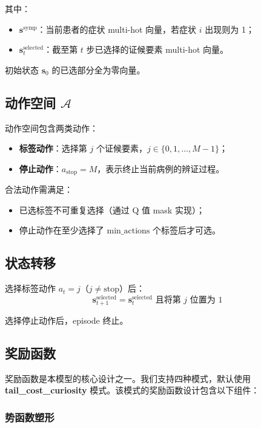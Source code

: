 \documentclass[12pt,a4paper]{article}
\newcommand{\Aset}{\mathcal{A}}
\begin{document}
其中：
\begin{itemize}
    \item $\mathbf{s}^{\text{symp}}$：当前患者的症状 multi-hot 向量，若症状 $i$ 出现则为 1；
    \item $\mathbf{s}^{\text{selected}}_t$：截至第 $t$ 步已选择的证候要素 multi-hot 向量。
\end{itemize}

初始状态 $\mathbf{s}_0$ 的已选部分全为零向量。

\subsection{动作空间 $\Aset$}

动作空间包含两类动作：
\begin{itemize}
    \item \textbf{标签动作}：选择第 $j$ 个证候要素，$j \in \{0, 1, \ldots, M-1\}$；
    \item \textbf{停止动作}：$a_{\text{stop}} = M$，表示终止当前病例的辨证过程。
\end{itemize}

合法动作需满足：
\begin{itemize}
    \item 已选标签不可重复选择（通过 Q 值 mask 实现）；
    \item 停止动作在至少选择了 $\text{min\_actions}$ 个标签后才可选。
\end{itemize}

\subsection{状态转移}

选择标签动作 $a_t = j$（$j \neq \text{stop}$）后：
\begin{equation}
    \mathbf{s}_{t+1}^{\text{selected}} = \mathbf{s}_t^{\text{selected}} \text{ 且将第 } j \text{ 位置为 } 1
\end{equation}

选择停止动作后，episode 终止。

\subsection{奖励函数}

奖励函数是本模型的核心设计之一。我们支持四种模式，默认使用 \textbf{tail\_cost\_curiosity} 模式。该模式的奖励函数设计包含以下组件：

\subsubsection{势函数塑形}
\end{document}
